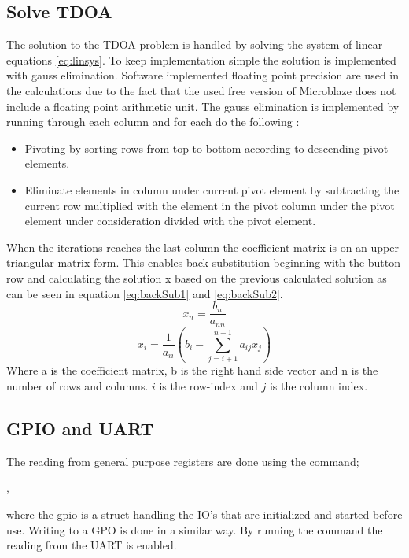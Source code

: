 \subsection{Solve TDOA}
The solution to the TDOA problem is handled by solving the system of linear equations \ref{eq:linsys}. To keep implementation simple the solution is implemented with gauss elimination. Software implemented floating point precision are used in the calculations due to the fact that the used free version of Microblaze does not include a floating point arithmetic unit.
The gauss elimination is implemented by running through each column and for each do the following \cite{gauss}:
\begin{itemize}
	\item Pivoting by sorting rows from top to bottom according to descending pivot elements.
	\item Eliminate elements in column under current pivot element by subtracting the current row multiplied with the element in the pivot column under the pivot element under consideration divided with the pivot element.
\end{itemize}
When the iterations reaches the last column the coefficient matrix is on an upper triangular matrix form. This enables back substitution beginning with the button row and calculating the solution x based on the previous calculated solution as can be seen in equation \ref{eq:backSub1} and \ref{eq:backSub2}.
\begin{equation}
	x_n = \frac{b_n}{a_{nn}}
	\label{eq:backSub1}
\end{equation}
\begin{equation}
	x_i = \frac{1}{a_{ii}} (b_i - \sum_{j=i+1}^{n-1} a_{ij}x_j)
	\label{eq:backSub2}
\end{equation}
Where a is the coefficient matrix, b is the right hand side vector and n is the number of rows and columns. $i$ is the row-index and $j$ is the column index.
\subsection{GPIO and UART}
The reading from general purpose registers are done using the command;

,

where the gpio is a struct handling the IO's that are initialized and started before use.
Writing to a GPO is done in a similar way.
By running the command  the reading from the UART is enabled.

